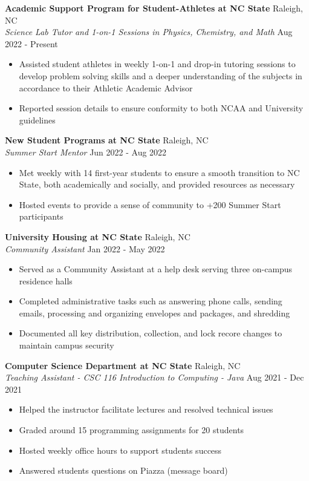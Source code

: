 \documentclass[a4paper]{article}
\begin{document}
\textbf{Academic Support Program for Student-Athletes at NC State} \hfill Raleigh, NC\\
\textit{Science Lab Tutor and 1-on-1 Sessions in Physics, Chemistry, and Math} \hfill Aug 2022 - Present\\
\vspace{-1mm}
\begin{itemize} \itemsep 1pt
	\item Assisted student athletes in weekly 1-on-1 and drop-in tutoring sessions to develop problem solving skills and a deeper understanding of the subjects in accordance to their Athletic Academic Advisor
	\item Reported session details to ensure conformity to both NCAA and University guidelines
\end{itemize}
\textbf{New Student Programs at NC State} \hfill Raleigh, NC\\
\textit{Summer Start Mentor} \hfill Jun 2022 - Aug 2022\\
\vspace{-1mm}
\begin{itemize} \itemsep 1pt
	\item Met weekly with 14 first-year students to ensure a smooth transition to NC State, both academically and socially, and provided resources as necessary
	\item Hosted events to provide a sense of community to +200 Summer Start participants
\end{itemize}
\textbf{University Housing at NC State} \hfill Raleigh, NC\\
\textit{Community Assistant} \hfill Jan 2022 - May 2022\\
\vspace{-1mm}
\begin{itemize} \itemsep 1pt
	\item Served as a Community Assistant at a help desk serving three on-campus residence halls
	\item Completed administrative tasks such as answering phone calls, sending emails, processing and organizing envelopes and packages, and shredding
	\item Documented all key distribution, collection, and lock recore changes to maintain campus security
\end{itemize}
\textbf{Computer Science Department at NC State} \hfill Raleigh, NC\\
\textit{Teaching Assistant - CSC 116 Introduction to Computing - Java} \hfill Aug 2021 - Dec 2021\\
\vspace{-1mm}
\begin{itemize} \itemsep 1pt
	\item Helped the instructor facilitate lectures and resolved technical issues
	\item Graded around 15 programming assignments for 20 students
	\item Hosted weekly office hours to support students\textquotesingle{} success
	\item Answered students\textquotesingle{} questions on Piazza (message board)
\end{itemize}






\ 
\end{document}
